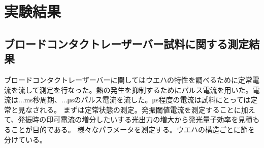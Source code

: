 
\chapter{実験結果}
\section{ブロードコンタクトレーザーバー試料に関する測定結果}%
ブロードコンタクトレーザーバーに関してはウエハの特性を調べるために定常電流を流して測定を行なった。熱の発生を抑制するためにパルス電流を用いた。電流は...ms秒周期、...μsのパルス電流を流した。μs程度の電流は試料にとっては定常と見なされる。
まずは定常状態の測定。発振閾値電流を測定することに加えて、発振時の印可電流の増分したいする光出力の増大から発光量子効率を見積もることが目的である。
様々なパラメータを測定する。ウエハの構造ごとに節を分けている。
